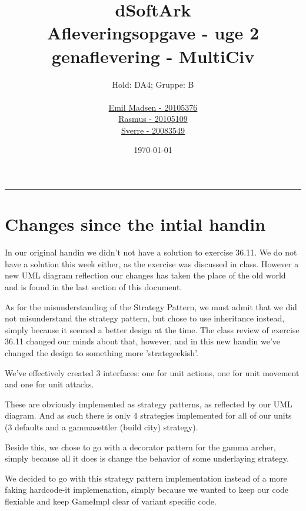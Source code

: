 \title{\huge dSoftArk \\
       \small Afleveringsopgave - uge 2 genaflevering - MultiCiv}
\author{Hold: DA4; Gruppe: B\\ \\
        \href{mailto:skeen@cs.au.dk}{Emil Madsen - 20105376}\\
        \href{mailto:emray@cs.au.dk}{Rasmus - 20105109}\\
        \href{mailto:sverre@cs.au.dk}{Sverre - 20083549}
       }
\date{\today}

\maketitle

\hrule

\section*{ Changes since the intial handin }
In our original handin we didn't not have a solution to exercise 36.11.
We do not have a solution this week either, as the exercise was discussed in class. 
However a new UML diagram reflection our changes has taken the place of the old world and is found in the last section of this document.

As for the misunderstanding of the Strategy Pattern, we must admit that we did
not misunderstand the strategy pattern, but chose to use inheritance
instead, simply because it seemed a better design at the time.
The class review of exercise 36.11 changed our minds about that, however, and in this new handin we've changed the design to something more 'strategeekish'.

We've effectively created 3 interfaces:
one for unit actions, 
one for unit movement 
and 
one for unit attacks. 

These are obviously implemented as strategy patterns, as reflected by our UML diagram. 
And as such there is only 4 strategies implemented for all of our units (3 defaults and a gammasettler (build city) strategy). 

Beside this, we chose to go with a decorator pattern for the gamma archer, simply because all it does is change the behavior of some underlaying strategy. 

We decided to go with this strategy pattern implementation instead of a more faking hardcode-it implemenation, simply because we wanted to keep our code flexiable and keep GameImpl clear of variant specific code.

